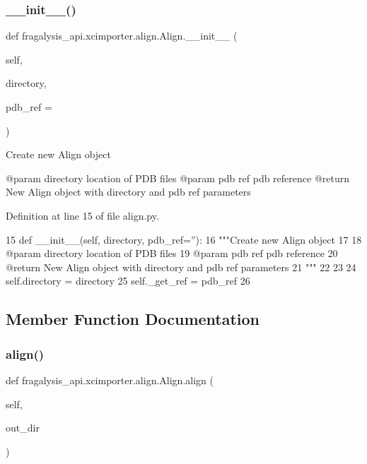 \subsubsection{\texorpdfstring{\+\_\+\+\_\+init\+\_\+\+\_\+()}{\_\_init\_\_()}}
{\footnotesize\ttfamily def fragalysis\+\_\+api.\+xcimporter.\+align.\+Align.\+\_\+\+\_\+init\+\_\+\+\_\+ (\begin{DoxyParamCaption}\item[{}]{self,  }\item[{}]{directory,  }\item[{}]{pdb\+\_\+ref = {\ttfamily \textquotesingle{}\textquotesingle{}} }\end{DoxyParamCaption})}

\begin{DoxyVerb}Create new Align object

@param directory location of PDB files
@param pdb ref pdb reference
@return New Align object with directory and pdb ref parameters
\end{DoxyVerb}
 

Definition at line 15 of file align.\+py.


\begin{DoxyCode}
15     \textcolor{keyword}{def }\_\_init\_\_(self, directory, pdb\_ref=''):
16         \textcolor{stringliteral}{"""Create new Align object}
17 \textcolor{stringliteral}{}
18 \textcolor{stringliteral}{        @param directory location of PDB files}
19 \textcolor{stringliteral}{        @param pdb ref pdb reference}
20 \textcolor{stringliteral}{        @return New Align object with directory and pdb ref parameters}
21 \textcolor{stringliteral}{        """}
22 
23 
24         self.directory = directory
25         self.\_get\_ref = pdb\_ref
26 
\end{DoxyCode}


\subsection{Member Function Documentation}
\mbox{\label{classfragalysis__api_1_1xcimporter_1_1align_1_1_align_a554c8cc5acbc9f5e86bb668c49ea1254}} 
\subsubsection{\texorpdfstring{align()}{align()}}
{\footnotesize\ttfamily def fragalysis\+\_\+api.\+xcimporter.\+align.\+Align.\+align (\begin{DoxyParamCaption}\item[{}]{self,  }\item[{}]{out\+\_\+dir }\end{DoxyParamCaption})}

